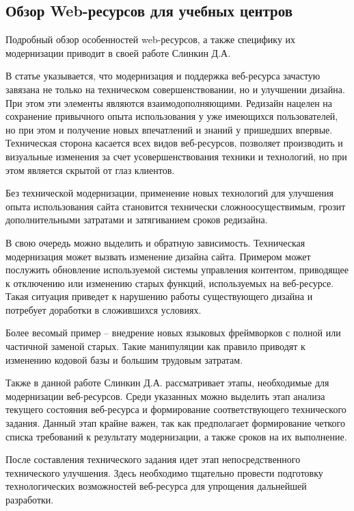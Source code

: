 \subsection{Обзор Web-ресурсов для учебных центров}

Подробный обзор особенностей web-ресурсов, а также специфику их модернизации приводит в своей работе \cite{slinkin-sovremennie} Слинкин Д.А.

В статье указывается, что модернизация и поддержка веб-ресурса зачастую завязана не только на техническом совершенствовании, но и улучшении дизайна.
При этом эти элементы являются взаимодополняющими.
Редизайн нацелен на сохранение привычного опыта использования у уже имеющихся пользователей, но при этом и получение новых впечатлений и знаний у пришедших впервые.
Техническая сторона касается всех видов веб-ресурсов, позволяет производить и визуальные изменения за счет усовершенствования техники и технологий, но при этом является скрытой от глаз клиентов.

Без технической модернизации, применение новых технологий для улучшения опыта использования сайта становится технически сложноосуществимым, грозит дополнительными затратами и затягиванием сроков редизайна.

В свою очередь можно выделить и обратную зависимость.
Техническая модернизация может вызвать изменение дизайна сайта.
Примером может послужить обновление используемой системы управления контентом, приводящее к отключению или изменению старых функций, используемых на веб-ресурсе.
Такая ситуация приведет к нарушению работы существующего дизайна и потребует доработки в сложившихся условиях.

Более весомый пример -- внедрение новых языковых фреймворков с полной или частичной заменой старых.
Такие манипуляции как правило приводят к изменению кодовой базы и большим трудовым затратам. 

Также в данной работе \cite{slinkin-sovremennie} Слинкин Д.А. рассматривает этапы, необходимые для модернизации веб-ресурсов.
Среди указанных можно выделить этап анализа текущего состояния веб-ресурса и формирование соответствующего технического задания.
Данный этап крайне важен, так как предполагает формирование четкого списка требований к результату модернизации, а также сроков на их выполнение.

После составления технического задания идет этап непосредственного технического улучшения.
Здесь необходимо тщательно провести подготовку технологических возможностей веб-ресурса для упрощения дальнейшей разработки.

